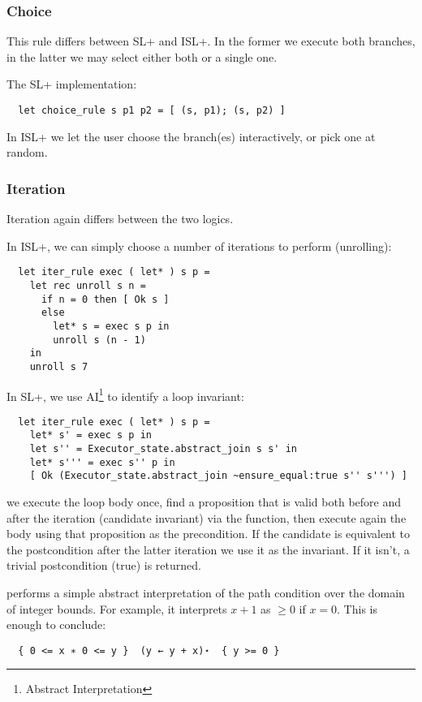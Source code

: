 \documentclass[parskip=half]{scrartcl}
\begin{document}
\subsubsection{Choice}

This rule differs between SL+ and ISL+. In the former we execute both branches, in the latter we may select either both or a single one.

The SL+ implementation:
\begin{verbatim}
  let choice_rule s p1 p2 = [ (s, p1); (s, p2) ]
\end{verbatim}

In ISL+ we let the user choose the branch(es) interactively, or pick one at random.

\subsubsection{Iteration}

Iteration again differs between the two logics.

In ISL+, we can simply choose a number of iterations to perform (unrolling):
\begin{verbatim}
  let iter_rule exec ( let* ) s p =
    let rec unroll s n =
      if n = 0 then [ Ok s ]
      else
        let* s = exec s p in
        unroll s (n - 1)
    in
    unroll s 7
\end{verbatim}

In SL+, we use AI\footnote{Abstract Interpretation} to identify a loop invariant:
\begin{verbatim}
  let iter_rule exec ( let* ) s p =
    let* s' = exec s p in
    let s'' = Executor_state.abstract_join s s' in
    let* s''' = exec s'' p in
    [ Ok (Executor_state.abstract_join ~ensure_equal:true s'' s''') ]
\end{verbatim}
we execute the loop body once, find a proposition that is valid both before and after the iteration (candidate invariant) via the  function, then execute again the body using that proposition as the precondition. If the candidate is equivalent to the postcondition after the latter iteration we use it as the invariant. If it isn't, a trivial postcondition (true) is returned.

 performs a simple abstract interpretation of the path condition over the domain of integer bounds. For example, it interprets \(x + 1\) as \(\geq 0\) if \(x = 0\). This is enough to conclude:
\begin{verbatim}
  { 0 <= x ∗ 0 <= y }  (y ← y + x)⋆  { y >= 0 }
\end{verbatim}
\end{document}
